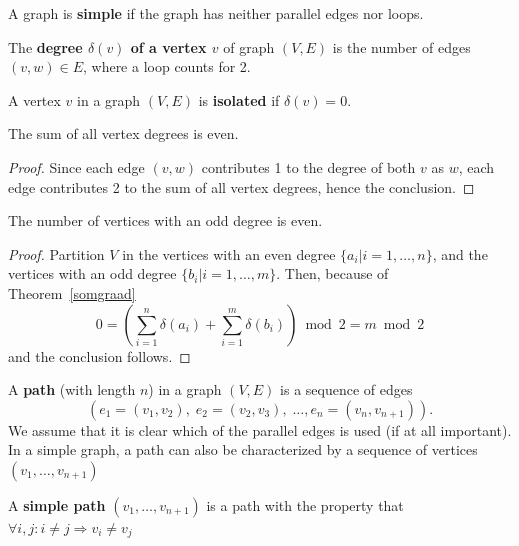 \begin{definition}
\textup{A graph is \textbf{simple} if the graph has neither parallel edges
nor loops.}
\end{definition}


\begin{definition}
  \textup{The \textbf{degree $\delta(v)$ of a vertex $v$} of graph
$(V,E)$ is the number of edges $(v,w) \in E$, where a loop counts for 2.}
\end{definition}


\begin{definition}
A vertex $v$ in a graph $(V,E)$ is {\bf isolated} if $\delta(v)=0$.
\end{definition}


\begin{theorem} \label{somgraad}
The sum of all vertex degrees is even.
\end{theorem}
\begin{proof}
Since each edge $(v,w)$ contributes 1 to the degree of both $v$ as
$w$, each edge contributes 2 to the sum of all vertex degrees, hence
the conclusion.
\end{proof}


\begin{theorem}
The number of vertices with an odd degree is even.
\end{theorem}
\begin{proof}
Partition $V$ in the vertices with an even degree $\{a_i |
i=1,\ldots,n\}$, and the vertices with an odd degree $\{b_i |
i=1,\ldots,m\}$.  Then, because of Theorem~\ref{somgraad}
\[0 = \left(\sum_{i=1}^{n} \delta(a_{i}) + \sum_{i=1}^{m} \delta(b_{i})\right)
\bmod 2 = m \bmod 2 \] and the conclusion follows.  \end{proof}


\begin{definition}[Path]
\textup{A \textbf{path} (with length $n$) in a graph $(V,E)$ is a
sequence of edges
\[( e_1=(v_{1},v_{2}),\;e_2=(v_{2},v_{3}),\;\ldots, e_{n}=(v_{n},v_{n+1})).\]
We assume that it is clear which of the parallel edges is used (if at
all important). \\
In a simple graph, a path can also be characterized by a sequence of
vertices $(v_{1}, \ldots , v_{n+1})$}
\end{definition}

\begin{definition}
  \textup{A \textbf{simple path} $(v_{1}, \ldots , v_{n+1})$ is a path
  with the property that $\forall i,j: i \neq j \Rightarrow v_{i} \neq v_{j}$ }
\end{definition}




